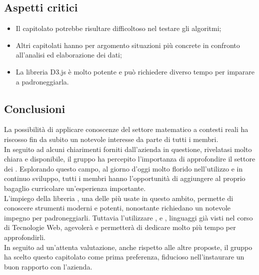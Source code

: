 \subsection{Aspetti critici}
\begin{itemize}
\item Il capitolato potrebbe risultare difficoltoso nel testare gli algoritmi;
\item Altri capitolati hanno per argomento situazioni più concrete in confronto all'analisi ed elaborazione dei dati;
\item La libreria D3.js è molto potente e può richiedere diverso tempo per imparare a padroneggiarla. 
\end{itemize}

\subsection{Conclusioni}
La possibilità di applicare conoscenze del settore matematico a contesti reali ha riscosso fin da subito un notevole interesse da parte di tutti i membri.\\ In seguito ad alcuni chiarimenti forniti dall'azienda in questione, rivelatasi molto chiara e disponibile, il gruppo ha percepito l'importanza di approfondire il settore dei . Esplorando questo campo, al giorno d'oggi molto florido nell'utilizzo e in continuo sviluppo, tutti i membri hanno l'opportunità di aggiungere al proprio bagaglio curricolare un'esperienza importante.\\
L'impiego della libreria , una delle più usate in questo ambito, permette di conoscere strumenti moderni e potenti, nonostante richiedano un notevole impegno per padroneggiarli. Tuttavia l'utilizzare ,  e , linguaggi già visti nel corso di Tecnologie Web, agevolerà e permetterà di dedicare molto più tempo per approfondirli.\\In seguito ad un'attenta valutazione, anche rispetto alle altre proposte, il gruppo ha scelto questo capitolato come prima preferenza, fiducioso nell'instaurare un buon rapporto con l'azienda.

